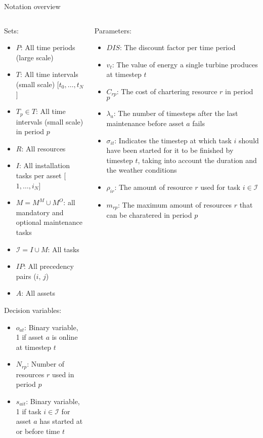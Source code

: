 \documentclass{beamer}
\begin{document}
\begin{frame}{Notation overview}
\tiny

\begin{columns}
\begin{column}{.48\textwidth}
Sets:
\begin{itemize}
\item $P$: All time periods (large scale)
\item $T$: All time intervals (small scale) [$t_0, \dots , t_N$]
\item $T_p \in T$: All time intervals (small scale) in period $p$
\item $R$: All resources
\item $I$: All installation tasks per asset [$1, \dots , i_N$]
\item $M = M^M \cup M^O$: all mandatory and optional maintenance tasks
\item $\mathcal{I} = I \cup M$: All tasks
\item $IP$: All precedency pairs ($i$, $j$)
\item $A$: All assets
\end{itemize}

Decision variables:
\begin{itemize}
\item $o_{at}$: Binary variable, 1 if asset $a$ is online at timestep $t$
\item $N_{rp}$: Number of resources $r$ used in period $p$
\item $s_{ait}$: Binary variable, 1 if task $i \in \mathcal{I}$ for asset $a$ has started at or before time $t$
\end{itemize}
\end{column}

\hfill

\begin{column}{.48\textwidth}
Parameters:
\begin{itemize}
\item $DIS$: The discount factor per time period
\item $v_t$: The value of energy a single turbine produces at timestep $t$
\item $C_{rp}$: The cost of chartering resource $r$ in period $p$
\item $\lambda_a$: The number of timesteps after the last maintenance before asset $a$ fails
\item $\sigma_{it}$: Indicates the timestep at which task $i$ should have been started for it to be finished by timestep $t$, taking into account the duration and the weather conditions
\item $\rho_{ir}$: The amount of resource $r$ used for task $i \in \mathcal{I}$
\item $m_{rp}$: The maximum amount of resources $r$ that can be charatered in period $p$
\end{itemize}
\end{column}
\end{columns}

\end{frame}
\end{document}
